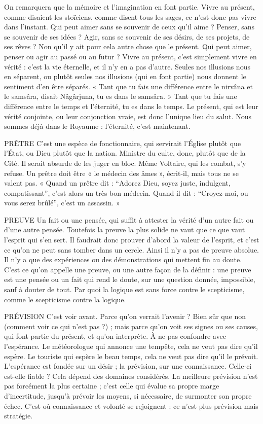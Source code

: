 On remarquera que la mémoire et l’imagination en font partie. Vivre au
présent, comme disaient les stoïciens, comme disent tous les sages, ce n’est
donc pas vivre dans l'instant. Qui peut aimer sans se souvenir de ceux qu'il
aime ? Penser, sans se souvenir de ses idées ? Agir, sans se souvenir de ses désirs,
de ses projets, de ses rêves ? Non qu’il y ait pour cela autre chose que le présent.
Qui peut aimer, penser ou agir au passé ou au futur ? Vivre au présent, c’est
simplement vivre en vérité : c’est la vie éternelle, et il n’y en a pas d’autre.
Seules nos illusions nous en séparent, ou plutôt seules nos illusions (qui en font
partie) nous donnent le sentiment d’en être séparés. « Tant que tu fais une différence
entre le nirvâna et le samsâra, disait Nâgârjuna, tu es dans le samsâra. »
Tant que tu fais une différence entre le temps et l'éternité, tu es dans le temps.
Le présent, qui est leur vérité conjointe, ou leur conjonction vraie, est donc
l'unique lieu du salut. Nous sommes déjà dans le Royaume : l'éternité, c’est
maintenant.

PRÊTRE C'est une espèce de fonctionnaire, qui servirait l’Église plutôt que
l'État, ou Dieu plutôt que la nation. Ministre du culte, donc,
plutôt que de la Cité. Il serait absurde de les juger en bloc. Même Voltaire, qui
les combat, s’y refuse. Un prêtre doit être « le médecin des âmes », écrit-il, mais
tous ne se valent pas. « Quand un prêtre dit : “Adorez Dieu, soyez juste, indulgent,
compatissant”, c’est alors un très bon médecin. Quand il dit : “Croyez-moi,
ou vous serez brûlé”, c’est un assassin. »

PREUVE Un fait ou une pensée, qui suffit à attester la vérité d’un autre fait
ou d’une autre pensée. Toutefois la preuve la plus solide ne vaut
que ce que vaut l’esprit qui s’en sert. Il faudrait donc prouver d’abord la valeur
de l'esprit, et c’est ce qu’on ne peut sans tomber dans un cercle. Ainsi il n’y a
pas de preuve absolue. Il n’y a que des expériences ou des démonstrations qui
mettent fin au doute. C’est ce qu’on appelle une preuve, ou une autre façon de
la définir : une preuve est une pensée ou un fait qui rend le doute, sur une
question donnée, impossible, sauf à douter de tout. Par quoi la logique est sans
force contre le scepticisme, comme le scepticisme contre la logique.

PRÉVISION C’est voir avant. Parce qu’on verrait l'avenir ? Bien sûr que non
(comment voir ce qui n’est pas ?) ; mais parce qu'on voit ses
signes ou ses causes, qui font partie du présent, et qu’on interprète. À ne pas
confondre avec l’espérance. Le météorologue qui annonce une tempête, cela ne
veut pas dire qu’il espère. Le touriste qui espère le beau temps, cela ne veut pas
dire qu’il le prévoit. L’espérance est fondée sur un désir ; la prévision, sur une
connaissance. Celle-ci est-elle fiable ? Cela dépend des domaines considérés. La
meilleure prévision n’est pas forcément la plus certaine ; c’est celle qui évalue sa
propre marge d'incertitude, jusqu’à prévoir les moyens, si nécessaire, de surmonter
son propre échec. C’est où connaissance et volonté se rejoignent : ce
n’est plus prévision mais stratégie.

